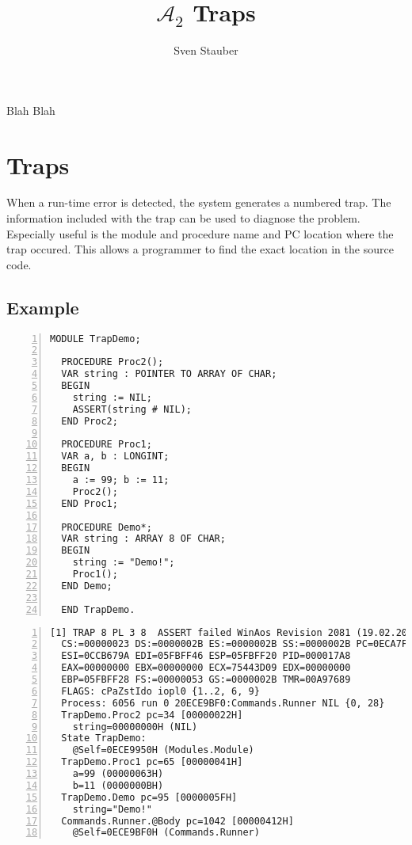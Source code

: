 \documentclass[a4paper,11pt]{article}
\newcommand{\AZ}{\ensuremath{\mathcal{A}_{2}}\xspace}
\begin{document}
\title{\AZ Traps}
\author{Sven Stauber}
\maketitle
Blah Blah

\tableofcontents

\section{Traps}\label{Traps}
When a run-time error is detected, the system generates a numbered trap. The information included with the trap can be used to diagnose the problem. Especially useful is the module and procedure name and PC location where the trap occured. This allows a programmer to find the exact location in the source code.

\subsection{Example}\label{section:ModulesAndCommands}

\begin{lstlisting}[language=Oberon,frame=none,numbers=left]
  MODULE TrapDemo;

  PROCEDURE Proc2();
  VAR string : POINTER TO ARRAY OF CHAR;
  BEGIN
    string := NIL;
    ASSERT(string # NIL);
  END Proc2;

  PROCEDURE Proc1;
  VAR a, b : LONGINT;
  BEGIN
    a := 99; b := 11;
    Proc2();
  END Proc1;

  PROCEDURE Demo*;
  VAR string : ARRAY 8 OF CHAR;
  BEGIN
    string := "Demo!";
    Proc1();
  END Demo;

  END TrapDemo.
\end{lstlisting}

\begin{lstlisting}[language=Oberon,frame=none,numbers=left]
  [1] TRAP 8 PL 3 8  ASSERT failed WinAos Revision 2081 (19.02.2009)
  CS:=00000023 DS:=0000002B ES:=0000002B SS:=0000002B PC=0ECA7F92
  ESI=0CCB679A EDI=05FBFF46 ESP=05FBFF20 PID=000017A8
  EAX=00000000 EBX=00000000 ECX=75443D09 EDX=00000000 
  EBP=05FBFF28 FS:=00000053 GS:=0000002B TMR=00A97689
  FLAGS: cPaZstIdo iopl0 {1..2, 6, 9}
  Process: 6056 run 0 20ECE9BF0:Commands.Runner NIL {0, 28}
  TrapDemo.Proc2 pc=34 [00000022H]
    string=00000000H (NIL)
  State TrapDemo:
    @Self=0ECE9950H (Modules.Module)
  TrapDemo.Proc1 pc=65 [00000041H]
    a=99 (00000063H)
    b=11 (0000000BH)
  TrapDemo.Demo pc=95 [0000005FH]
    string="Demo!"
  Commands.Runner.@Body pc=1042 [00000412H]
    @Self=0ECE9BF0H (Commands.Runner)
\end{lstlisting}
\end{document}
